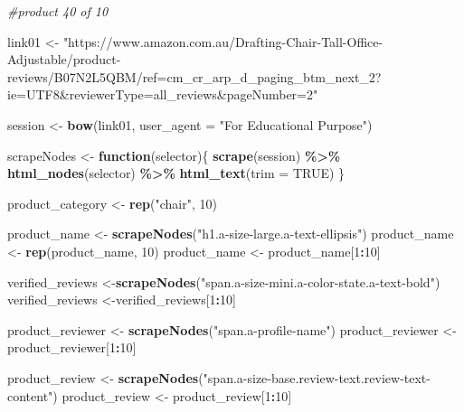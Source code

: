 \documentclass[
]{article}
\newenvironment{Shaded}{\begin{snugshade}}{\end{snugshade}}
\newcommand{\AttributeTok}[1]{\textcolor[rgb]{0.13,0.29,0.53}{#1}}
\newcommand{\CommentTok}[1]{\textcolor[rgb]{0.56,0.35,0.01}{\textit{#1}}}
\newcommand{\ConstantTok}[1]{\textcolor[rgb]{0.56,0.35,0.01}{#1}}
\newcommand{\ControlFlowTok}[1]{\textcolor[rgb]{0.13,0.29,0.53}{\textbf{#1}}}
\newcommand{\DecValTok}[1]{\textcolor[rgb]{0.00,0.00,0.81}{#1}}
\newcommand{\FunctionTok}[1]{\textcolor[rgb]{0.13,0.29,0.53}{\textbf{#1}}}
\newcommand{\NormalTok}[1]{#1}
\newcommand{\OtherTok}[1]{\textcolor[rgb]{0.56,0.35,0.01}{#1}}
\newcommand{\SpecialCharTok}[1]{\textcolor[rgb]{0.81,0.36,0.00}{\textbf{#1}}}
\newcommand{\StringTok}[1]{\textcolor[rgb]{0.31,0.60,0.02}{#1}}
\begin{document}
\begin{Shaded}
\begin{Highlighting}[]
\CommentTok{\#product 40 of 10}

\NormalTok{link01 }\OtherTok{\textless{}{-}} \StringTok{"https://www.amazon.com.au/Drafting{-}Chair{-}Tall{-}Office{-}Adjustable/product{-}reviews/B07N2L5QBM/ref=cm\_cr\_arp\_d\_paging\_btm\_next\_2?ie=UTF8\&reviewerType=all\_reviews\&pageNumber=2"}


\NormalTok{  session }\OtherTok{\textless{}{-}} \FunctionTok{bow}\NormalTok{(link01,}
               \AttributeTok{user\_agent =} \StringTok{"For Educational Purpose"}\NormalTok{)}

\NormalTok{  scrapeNodes }\OtherTok{\textless{}{-}} \ControlFlowTok{function}\NormalTok{(selector)\{}
    \FunctionTok{scrape}\NormalTok{(session) }\SpecialCharTok{\%\textgreater{}\%}
      \FunctionTok{html\_nodes}\NormalTok{(selector) }\SpecialCharTok{\%\textgreater{}\%}
      \FunctionTok{html\_text}\NormalTok{(}\AttributeTok{trim =} \ConstantTok{TRUE}\NormalTok{)}
\NormalTok{  \}}

\NormalTok{  product\_category }\OtherTok{\textless{}{-}} \FunctionTok{rep}\NormalTok{(}\StringTok{"chair"}\NormalTok{, }\DecValTok{10}\NormalTok{)}

\NormalTok{  product\_name }\OtherTok{\textless{}{-}} \FunctionTok{scrapeNodes}\NormalTok{(}\StringTok{"h1.a{-}size{-}large.a{-}text{-}ellipsis"}\NormalTok{)}
\NormalTok{  product\_name }\OtherTok{\textless{}{-}} \FunctionTok{rep}\NormalTok{(product\_name, }\DecValTok{10}\NormalTok{)}
\NormalTok{  product\_name }\OtherTok{\textless{}{-}}\NormalTok{ product\_name[}\DecValTok{1}\SpecialCharTok{:}\DecValTok{10}\NormalTok{]}
  
\NormalTok{  verified\_reviews }\OtherTok{\textless{}{-}}\FunctionTok{scrapeNodes}\NormalTok{(}\StringTok{"span.a{-}size{-}mini.a{-}color{-}state.a{-}text{-}bold"}\NormalTok{)}
\NormalTok{  verified\_reviews }\OtherTok{\textless{}{-}}\NormalTok{verified\_reviews[}\DecValTok{1}\SpecialCharTok{:}\DecValTok{10}\NormalTok{]}
  
\NormalTok{  product\_reviewer }\OtherTok{\textless{}{-}} \FunctionTok{scrapeNodes}\NormalTok{(}\StringTok{"span.a{-}profile{-}name"}\NormalTok{)}
\NormalTok{  product\_reviewer }\OtherTok{\textless{}{-}}\NormalTok{ product\_reviewer[}\DecValTok{1}\SpecialCharTok{:}\DecValTok{10}\NormalTok{]}
  
\NormalTok{  product\_review }\OtherTok{\textless{}{-}} \FunctionTok{scrapeNodes}\NormalTok{(}\StringTok{"span.a{-}size{-}base.review{-}text.review{-}text{-}content"}\NormalTok{)}
\NormalTok{  product\_review }\OtherTok{\textless{}{-}}\NormalTok{ product\_review[}\DecValTok{1}\SpecialCharTok{:}\DecValTok{10}\NormalTok{]}
  

\end{Highlighting}
\end{Shaded}
\end{document}

